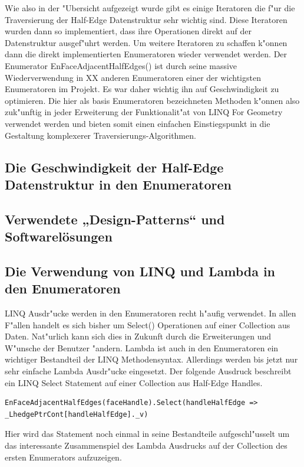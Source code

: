 \documentclass[pagesize, paper=a4, fontsize=12pt,titlepage=true, headings=small, headnosepline, abstractoff, liststotoc, nochapterprefix, plainheadsepline]{scrreprt}
\newcommand{\LFGS}{LINQ For Geometry }
\newcommand{\HES}{Half-Edge Datenstruktur }
\begin{document}
Wie also in der "Ubersicht aufgezeigt wurde gibt es einige Iteratoren die f"ur die Traversierung der \HES sehr wichtig sind. Diese Iteratoren wurden dann so implementiert, dass ihre Operationen direkt auf der Datenstruktur ausgef"uhrt werden. Um weitere Iteratoren zu schaffen k"onnen dann die direkt implementierten Enumeratoren wieder verwendet werden. Der Enumerator EnFaceAdjacentHalfEdges() ist durch seine massive Wiederverwendung in XX anderen Enumeratoren einer der wichtigsten Enumeratoren im Projekt. Es war daher wichtig ihn auf Geschwindigkeit zu optimieren. Die hier als basis Enumeratoren bezeichneten Methoden k"onnen also zuk"unftig in jeder Erweiterung der Funktionalit"at von \LFGS verwendet werden und bieten somit einen einfachen Einstiegspunkt in die Gestaltung komplexerer Traversierungs-Algorithmen.
		\subsection {Die Geschwindigkeit der Half-Edge Datenstruktur in den Enumeratoren}
		\subsection {Verwendete „Design-Patterns“ und Softwarelösungen}
		\subsection {Die Verwendung von LINQ und Lambda in den Enumeratoren}
			LINQ Ausdr"ucke werden in den Enumeratoren recht h"aufig verwendet. In allen F"allen handelt es sich bisher um Select() Operationen auf einer Collection aus Daten. Nat"urlich kann sich dies in Zukunft durch die Erweiterungen und W"unsche der Benutzer "andern. Lambda ist auch in den Enumeratoren ein wichtiger Bestandteil der LINQ Methodensyntax. Allerdings werden bis jetzt nur sehr einfache Lambda Ausdr"ucke eingesetzt. Der folgende Ausdruck beschreibt ein LINQ Select Statement auf einer Collection aus Half-Edge Handles.
\begin{lstlisting}
EnFaceAdjacentHalfEdges(faceHandle).Select(handleHalfEdge => _LhedgePtrCont[handleHalfEdge]._v)
\end{lstlisting}

Hier wird das Statement noch einmal in seine Bestandteile aufgeschl"usselt um das interessante Zusammenspiel des Lambda Ausdrucks auf der Collection des ersten Enumerators aufzuzeigen.
\end{document}
